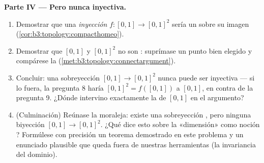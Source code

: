 \begin{problem}
\medskip
\noindent\textbf{Parte IV --- Pero nunca inyectiva.}
\begin{enumerate}[resume]
  \item Demostrar que una \emph{inyección}
   $f \colon [0,1]
        \to [0,1]^2$ sería un
   sobre su imagen
        (\cref{cor:b3:topology:compacthomeo}).
  \item Demostrar que $[0,1]$ y $[0,1]^2$ no son
  : suprímase un punto
  bien elegido y compárese la
        (\cref{met:b3:topology:connectargument}).
  \item Concluir: una sobreyección
   $[0,1] \to [0,1]^2$
  nunca puede ser inyectiva --- si lo fuera, la pregunta 8 haría
  $[0,1]^2 = f([0,1])$  a
  $[0,1]$, en contra de la pregunta 9. ¿Dónde intervino exactamente la
   de $[0,1]$ en el argumento? \item (Culminación) Reúnase la
  moraleja: existe una sobreyección
  , pero ninguna biyección
   $[0,1] \to
        [0,1]^2$. ¿Qué dice esto sobre la «dimensión» como noción
  ? Formúlese con precisión
  un teorema demostrado en este problema y un enunciado plausible que
  queda fuera de nuestras herramientas (la invariancia del dominio).
\end{enumerate}


\end{problem}
